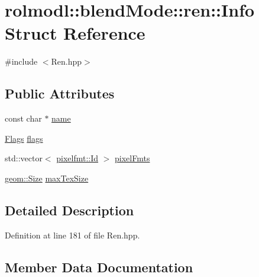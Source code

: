 \hypertarget{structrolmodl_1_1blend_mode_1_1ren_1_1_info}{}\section{rolmodl\+::blend\+Mode\+::ren\+::Info Struct Reference}
\label{structrolmodl_1_1blend_mode_1_1ren_1_1_info}


{\ttfamily \#include $<$Ren.\+hpp$>$}

\subsection*{Public Attributes}
\begin{DoxyCompactItemize}
\item 
const char $\ast$ \mbox{\hyperlink{structrolmodl_1_1blend_mode_1_1ren_1_1_info_aa769a93854007312ff42d437072c8197}{name}}
\item 
\mbox{\hyperlink{structrolmodl_1_1blend_mode_1_1ren_1_1_flags}{Flags}} \mbox{\hyperlink{structrolmodl_1_1blend_mode_1_1ren_1_1_info_a11f15cebda0c56e7f09b1b0ab0256df7}{flags}}
\item 
std\+::vector$<$ \mbox{\hyperlink{namespacerolmodl_1_1pixelfmt_a96282713e4465ba9211c8fd3a702b52b}{pixelfmt\+::\+Id}} $>$ \mbox{\hyperlink{structrolmodl_1_1blend_mode_1_1ren_1_1_info_ad513d03521e009966f3687f6280f362c}{pixel\+Fmts}}
\item 
\mbox{\hyperlink{structrolmodl_1_1geom_1_1_size}{geom\+::\+Size}} \mbox{\hyperlink{structrolmodl_1_1blend_mode_1_1ren_1_1_info_a772876f3b50dac2375cb5f2661fd0489}{max\+Tex\+Size}}
\end{DoxyCompactItemize}


\subsection{Detailed Description}


Definition at line 181 of file Ren.\+hpp.



\subsection{Member Data Documentation}
\mbox{\label{structrolmodl_1_1blend_mode_1_1ren_1_1_info_a11f15cebda0c56e7f09b1b0ab0256df7}} 
